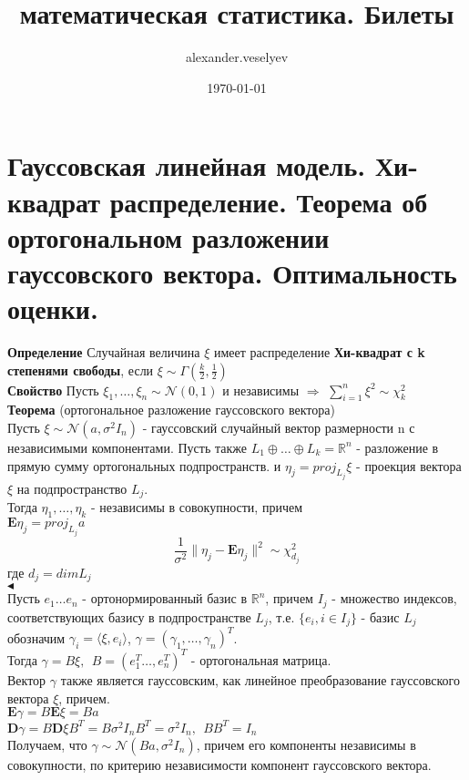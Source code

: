 \documentclass{article}
\title{математическая статистика. Билеты}
\author{alexander.veselyev }
\date{\today}
\begin{document}
\section{Гауссовская линейная модель. Хи-квадрат распределение. Теорема об ортогональном разложении гауссовского вектора. Оптимальность оценки.}

\textbf{Определение} Случайная величина $\xi$ имеет распределение \textbf{Хи-квадрат с k степенями свободы}, если $\xi\sim\Gamma(\frac{k}{2},\frac{1}{2})$\\

\textbf{Свойство} Пусть $\xi_1,\dots,\xi_n\sim\mathcal{N}(0,1)$ и независимы
$\Rightarrow$ $\sum_{i=1}^n\xi^2\sim\chi^2_k$\\ 
 
\textbf{Теорема} (ортогональное разложение гауссовского вектора)\\
Пусть $\xi \sim \mathcal{N}(a, \sigma^2I_n)$ - гауссовский случайный вектор размерности n  с независимыми компонентами. Пусть также $L_1\oplus\dots\oplus L_k = \mathbb{R}^n$ - разложение в прямую сумму ортогональных подпространств. и $\eta_j = proj_{L_j}\xi$ - проекция вектора $\xi$ на подпространство $L_j$.\\
Тогда $\eta_1,\dots,\eta_k$ - независимы в совокупности, причем\\
$\mathbf{E}\eta_j = proj_{L_j}a$\\
$$\frac{1}{\sigma^2}\|\eta_j - \mathbf{E}\eta_j\|^2 \sim \chi^2_{d_j}$$
где $d_j = dim L_j$\\
$\blacktriangleleft$\\
Пусть $e_1\dots e_n$ - ортонормированный базис в $\mathbb{R}^n$, причем $I_j$ - множество индексов, соответствующих базису в подпространстве $L_j$, т.е. $\{e_i, i \in I_j\}$ - базис $L_j$\\
обозначим $\gamma_i = \langle\xi,e_i\rangle$, $\gamma = (\gamma_1,\dots,\gamma_n)^T$.\\
Тогда $\gamma = B\xi,\ \ B = (e_1^T\dots,e_n^T)^T$ - ортогональная матрица.\\
Вектор $\gamma$ также является гауссовским, как линейное преобразование гауссовского вектора $\xi$, причем.\\
$\mathbf{E}\gamma = B\mathbf{E}\xi = Ba$\\
$\mathbf{D}\gamma = B\mathbf{D}\xi B^T = B\sigma^2I_nB^T = \sigma^2I_n,\ \ BB^T = I_n$\\
Получаем, что $\gamma\sim\mathcal{N}(Ba, \sigma^2I_n)$, причем его компоненты независимы в совокупности, по критерию независимости компонент гауссовского вектора.\\
\end{document}
